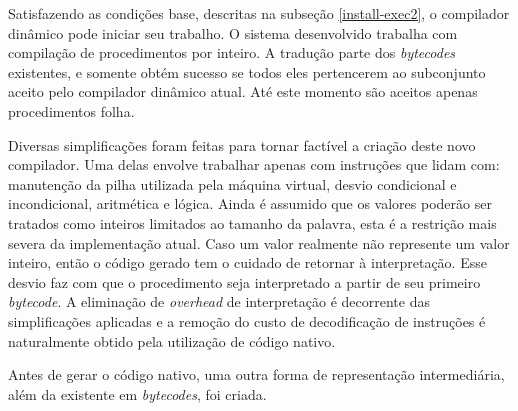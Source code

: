 

Satisfazendo as condições base, descritas na subseção
\ref{install-exec2}, o compilador dinâmico pode iniciar seu trabalho.
O sistema desenvolvido trabalha com compilação de procedimentos por
inteiro. A tradução parte dos \textit{bytecodes} existentes,
e somente obtém sucesso se todos eles pertencerem ao subconjunto
aceito pelo compilador
dinâmico atual. Até este momento são aceitos apenas procedimentos folha.


Diversas simplificações foram feitas para tornar factível a criação
deste novo compilador. Uma delas envolve trabalhar apenas com
instruções que lidam com: manutenção da pilha utilizada pela máquina
virtual, desvio condicional e incondicional, aritmética e
lógica. Ainda é assumido que os valores poderão ser tratados como
inteiros limitados ao tamanho da palavra, esta é a restrição mais severa da
implementação atual. Caso um valor realmente não represente um valor
inteiro, então o código gerado tem o cuidado de retornar à
interpretação. Esse desvio faz com que o procedimento seja
interpretado a partir de seu primeiro \textit{bytecode}.
A eliminação de \textit{overhead} de interpretação é decorrente das
simplificações aplicadas e a remoção do custo de decodificação de
instruções é naturalmente obtido pela utilização de código nativo.


Antes de gerar o código nativo, uma outra forma de representação
intermediária, além da existente em \textit{bytecodes}, foi criada.



